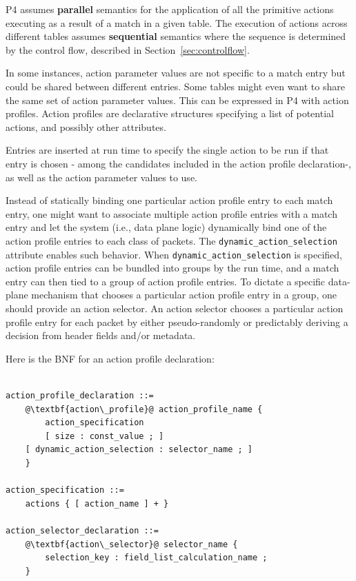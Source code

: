 \documentclass[12pt]{article}
\begin{document}
P4 assumes \textbf{parallel} semantics for the application of all the primitive actions 
executing as a result of a match in a given table. The execution of actions 
across different tables assumes \textbf{sequential} semantics where the sequence is 
determined by the control flow, described in Section~\ref{sec:controlflow}.


In some instances, action parameter values are not specific to a match entry but
could be shared between different entries. Some tables might even want to share
the same set of action parameter values. This can be expressed in P4 with
action profiles.
Action profiles are declarative structures specifying a list of potential
actions, and possibly other attributes.

Entries are inserted at run time to specify the single action to be run if that
entry is chosen - among the candidates included in the action profile
declaration-, as well as the action parameter values to use.

Instead of statically binding one particular action profile entry to each match
entry, one might want to associate multiple action profile entries with a match
entry and let the system (i.e., data plane logic) dynamically bind one of the
action profile entries to each class of packets. The
\texttt{dynamic_action_selection} attribute enables such behavior. When
\texttt{dynamic_action_selection} is specified, action profile entries can be
bundled into groups by the run time, and a match entry can then tied to a group
of action profile entries. To dictate a specific data-plane mechanism that
chooses a particular action profile entry in a group, one should provide an
action selector. An action selector chooses a particular action profile entry
for each packet by either pseudo-randomly or predictably deriving a decision
from header fields and/or metadata.

Here is the BNF for an action profile declaration:

\begin{lstlisting}[frame=single,backgroundcolor=\color{bnfgreen},escapechar=\@]

action_profile_declaration ::=
    @\textbf{action\_profile}@ action_profile_name {
        action_specification
        [ size : const_value ; ]
	[ dynamic_action_selection : selector_name ; ]
    }

action_specification ::= 
    actions { [ action_name ] + }

action_selector_declaration ::=
    @\textbf{action\_selector}@ selector_name {
        selection_key : field_list_calculation_name ;
    }

\end{lstlisting}
\end{document}
